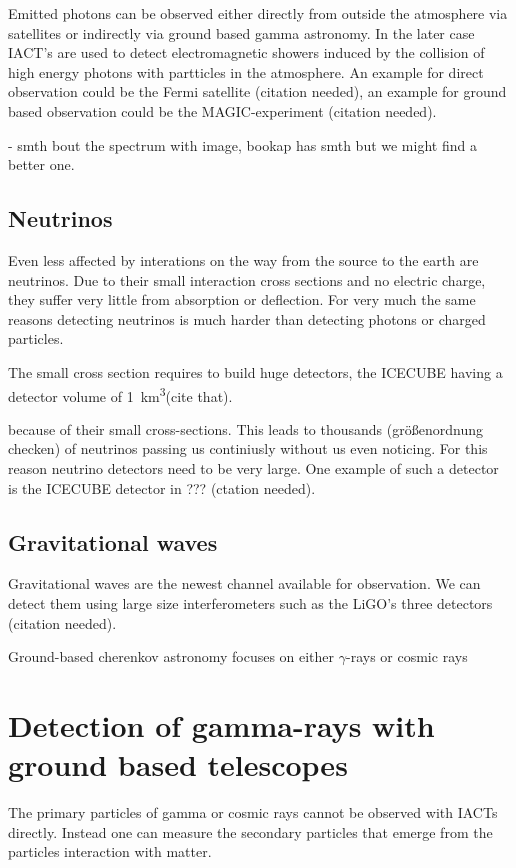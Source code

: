 Emitted photons can be observed either directly
from outside the atmosphere via satellites or indirectly
via ground based gamma astronomy. In the later case
IACT's are used to detect electromagnetic showers induced
by the collision of high energy photons with partticles in the atmosphere.
An example for direct observation could be the Fermi satellite (citation needed),
an example for ground based observation could be the
MAGIC-experiment (citation needed).

- smth bout the spectrum with image, bookap has smth but we might find a better one.

\subsection{Neutrinos}
Even less affected by interations on the way from the source to the earth are neutrinos.
Due to their small interaction cross sections and no electric charge, they 
suffer very little from absorption or deflection.
For very much the same reasons detecting neutrinos is much harder
than detecting photons or charged particles.

The small cross section requires to build huge detectors, 
the ICECUBE having a detector volume of \SI{1}{\kilo\meter^3}(cite that).

because of
their small cross-sections. This leads to thousands (größenordnung checken) of
neutrinos passing us continiusly without us even noticing.
For this reason neutrino detectors need to be very large. One example
of such a detector is the ICECUBE detector in ??? (ctation needed).

\subsection{Gravitational waves}
Gravitational waves are the newest channel available for observation.
We can detect them using large size interferometers such as
the LiGO's three detectors (citation needed).



Ground-based cherenkov astronomy focuses on either $\gamma$-rays or cosmic rays


\section{Detection of gamma-rays with ground based telescopes}
The primary particles of gamma or cosmic rays cannot be 
observed with IACTs directly. Instead one can measure the secondary particles
that emerge from the particles interaction with matter.

